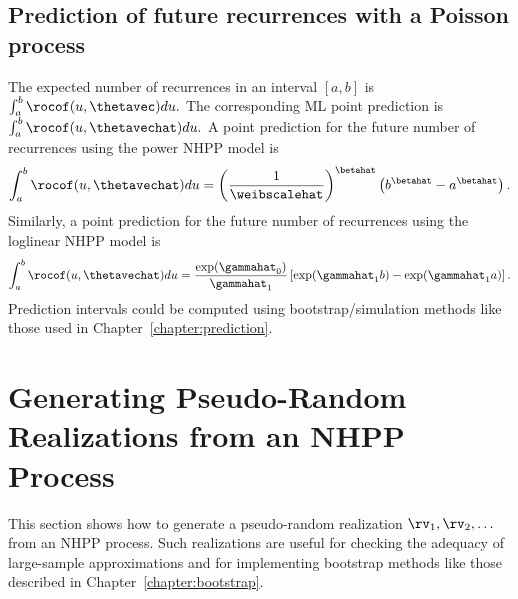 \subsection{Prediction of future recurrences with a Poisson process}

The expected number of recurrences in an interval $[a, b]$ is $
\int_{a}^{b} \rocof(u,\thetavec) du.
$
The corresponding ML point prediction is
$
\int_{a}^{b} \rocof(u,\thetavechat) du.
$
A point prediction for the future number of recurrences using
the power NHPP model is
\begin{displaymath}
\int_{a}^{b} \rocof(u,\thetavechat) du=
\left (
\frac{
1
     }
     {
\weibscalehat
     }	
\right )^{\betahat}
\left (
b^{\betahat}
-
a^{\betahat}
\right ).
\end{displaymath}
Similarly, a point prediction for the future number of recurrences
using the loglinear NHPP model is
\begin{displaymath}
\int_{a}^{b} \rocof(u,\thetavechat) du=
\frac{
 \exp(\gammahat_{0})
     }
     {
\gammahat_{1}
     }	
\left [
\exp(\gammahat_{1} b)
-
\exp(\gammahat_{1} a)
\right ].
\end{displaymath}
Prediction intervals could be computed using bootstrap/simulation
methods like those used in Chapter~\ref{chapter:prediction}.

\section{Generating Pseudo-Random Realizations from an NHPP Process}
\label{section:random.nhpp}
This section shows how to generate a pseudo-random realization
$\rv_{1}, \rv_{2}, \dots$ from an NHPP process.  Such realizations are
useful for checking the adequacy of large-sample approximations and
for implementing bootstrap methods like those described in
Chapter~\ref{chapter:bootstrap}.

